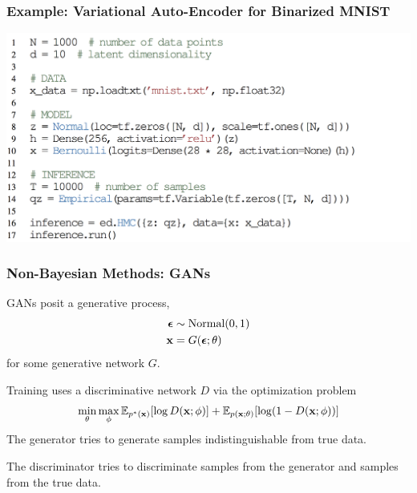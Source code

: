 \documentclass[10pt,
               xcolor={usenames,dvipsnames},
               hyperref={colorlinks,linktoc=all,citecolor=Plum,linkcolor=MidnightBlue,urlcolor=MidnightBlue},noamssymb]{beamer}
\begin{document}
\begin{frame}[t]
\frametitle{Example: Variational Auto-Encoder for Binarized MNIST}
\vspace{2.5ex}
\begin{center}
\includegraphics[width=1.05\textwidth]{img/vae_example_hmc.png}
\end{center}
\end{frame}

\begin{frame}
\frametitle{Non-Bayesian Methods: GANs}
GANs posit a generative process,
\begin{align*}
\boldsymbol{\mathbf{\epsilon}} &\sim \text{Normal}(0, 1) \\
\boldsymbol{\mathbf{x}} &= G(\boldsymbol{\mathbf{\epsilon}};\theta)
\end{align*}
for some generative network $G$.

Training uses a discriminative network $D$ via the
optimization problem
\begin{equation*}
\min_\theta \max_\phi
\mathbb{E}_{p^*(\boldsymbol{\mathbf{x}})} [ \log D(\boldsymbol{\mathbf{x}}; \phi) ]
+ \mathbb{E}_{p(\boldsymbol{\mathbf{x}}; \theta)} [ \log (1 - D(\boldsymbol{\mathbf{x}}; \phi)) ]
\end{equation*}
The generator tries to generate samples indistinguishable from true data.

The discriminator tries to discriminate samples from the generator and
samples from the true data.


\end{frame}
\end{document}
